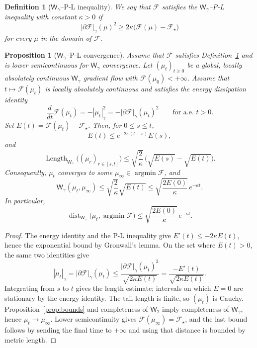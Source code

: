 \documentclass{article}
\newtheorem{proposition}[theorem]{Proposition}
\newtheorem{definition}[theorem]{Definition}
\newcommand{\MF}{\mathcal{F}}
\newcommand{\Wtwo}{\mathsf{W}_2}
\newcommand{\Wg}{\mathsf{W}_{\gamma}}
\begin{document}
\begin{definition}[$\Wg$--P-L inequality]
\label{def:gamma-pl}
We say that $\MF$ satisfies the $\Wg$--P-L inequality with constant
$\kappa>0$ if
\[
    |\partial\MF|_\gamma(\mu)^2
    \ge
    2\kappa\bigl(\MF(\mu)-\MF_\star\bigr)
\]
for every $\mu$ in the domain of $\MF$.
\end{definition}

\begin{proposition}[$\Wg$--P-L convergence]
\label{prop:gamma-pl-convergence}
Assume that $\MF$ satisfies Definition~\ref{def:gamma-pl} and is lower
semicontinuous for $\Wg$ convergence. Let $(\mu_t)_{t\ge0}$ be a global,
locally absolutely continuous $\Wg$ gradient flow with $\MF(\mu_0)<+\infty$.
Assume that $t\mapsto\MF(\mu_t)$ is locally absolutely continuous and satisfies
the energy dissipation identity
\[
    \frac{d}{dt}\MF(\mu_t)
    =
    -|\dot\mu_t|_\gamma^2
    =
    -|\partial\MF|_\gamma(\mu_t)^2
    \qquad\text{for a.e. }t>0 .
\]
Set $E(t)=\MF(\mu_t)-\MF_\star$. Then, for $0\le s\le t$,
\[
    E(t)\le e^{-2\kappa(t-s)}E(s),
\]
and
\[
    \operatorname{Length}_{\Wg}\bigl((\mu_r)_{r\in[s,t]}\bigr)
    \le
    \sqrt{\frac{2}{\kappa}}\,
    \bigl(\sqrt{E(s)}-\sqrt{E(t)}\bigr).
\]
Consequently, $\mu_t$ converges to some
$\mu_\infty\in\operatorname*{argmin}\MF$, and
\[
    \Wg(\mu_t,\mu_\infty)
    \le
    \sqrt{\frac{2}{\kappa}}\sqrt{E(t)}
    \le
    \sqrt{\frac{2E(0)}{\kappa}}\,e^{-\kappa t}.
\]
In particular,
\[
    \operatorname{dist}_{\Wg}\bigl(\mu_t,\operatorname*{argmin}\MF\bigr)
    \le
    \sqrt{\frac{2E(0)}{\kappa}}\,e^{-\kappa t}.
\]
\end{proposition}

\begin{proof}
The energy identity and the P-L inequality give
$E'(t)\le -2\kappa E(t)$, hence the exponential bound by Gronwall's lemma.  On
the set where $E(t)>0$, the same two identities give
\[
    |\dot\mu_t|_\gamma
    =
    |\partial\MF|_\gamma(\mu_t)
    \le
    \frac{|\partial\MF|_\gamma(\mu_t)^2}
         {\sqrt{2\kappa E(t)}}
    =
    \frac{-E'(t)}{\sqrt{2\kappa E(t)}} .
\]
Integrating from $s$ to $t$ gives the length estimate; intervals on which
$E=0$ are stationary by the energy identity.  The tail length is finite, so
$(\mu_t)$ is Cauchy.  Proposition~\ref{prop:bounds} and completeness of
$\Wtwo$ imply completeness of $\Wg$, hence $\mu_t\to\mu_\infty$.  Lower
semicontinuity gives
$\MF(\mu_\infty)=\MF_\star$, and the last bound follows by sending the final
time to $+\infty$ and using that distance is bounded by metric length.
\end{proof}
\end{document}
